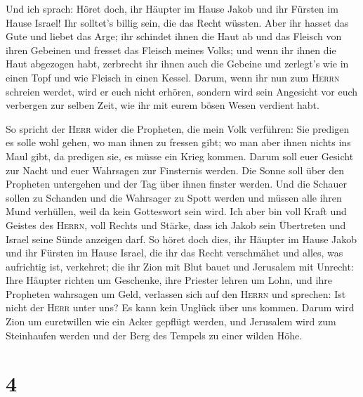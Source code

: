  Und ich sprach: Höret doch, ihr Häupter im Hause Jakob
und ihr Fürsten im Hause Israel! Ihr solltet's billig sein, die das
Recht wüssten.  Aber ihr hasset das Gute und liebet das
Arge; ihr schindet ihnen die Haut ab und das Fleisch von ihren Gebeinen
 und fresset das Fleisch meines Volks; und wenn ihr ihnen
die Haut abgezogen habt, zerbrecht ihr ihnen auch die Gebeine und
zerlegt's wie in einen Topf und wie Fleisch in einen Kessel.
 Darum, wenn ihr nun zum \textsc{Herrn} schreien werdet,
wird er euch nicht erhören, sondern wird sein Angesicht vor euch
verbergen zur selben Zeit, wie ihr mit eurem bösen Wesen verdient habt.

 So spricht der \textsc{Herr} wider die Propheten, die
mein Volk verführen: Sie predigen es solle wohl gehen, wo man ihnen zu
fressen gibt; wo man aber ihnen nichts ins Maul gibt, da predigen sie,
es müsse ein Krieg kommen.  Darum soll euer Gesicht zur
Nacht und euer Wahrsagen zur Finsternis werden. Die Sonne soll über den
Propheten untergehen und der Tag über ihnen finster werden.
 Und die Schauer sollen zu Schanden und die Wahrsager zu
Spott werden und müssen alle ihren Mund verhüllen, weil da kein
Gotteswort sein wird.  Ich aber bin voll Kraft und Geistes
des \textsc{Herrn}, voll Rechts und Stärke, dass ich Jakob sein
Übertreten und Israel seine Sünde anzeigen darf.  So höret
doch dies, ihr Häupter im Hause Jakob und ihr Fürsten im Hause Israel,
die ihr das Recht verschmähet und alles, was aufrichtig ist, verkehret;
 die ihr Zion mit Blut bauet und Jerusalem mit Unrecht:
 Ihre Häupter richten um Geschenke, ihre Priester lehren
um Lohn, und ihre Propheten wahrsagen um Geld, verlassen sich auf den
\textsc{Herrn} und sprechen: Ist nicht der \textsc{Herr} unter uns? Es
kann kein Unglück über uns kommen.  Darum wird Zion um
euretwillen wie ein Acker gepflügt werden, und Jerusalem wird zum
Steinhaufen werden und der Berg des Tempels zu einer wilden Höhe.

\hypertarget{section-3}{%
\section{4}\label{section-3}}

